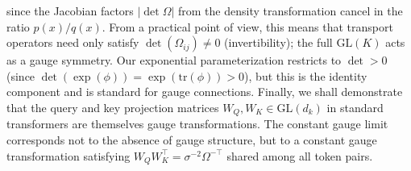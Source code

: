 \documentclass[twoside,11pt]{article}
\begin{document}
since the Jacobian factors $|\det\Omega|$ from the density transformation cancel in the ratio $p(x)/q(x)$. From a practical point of view, this means that transport operators need only satisfy $\det(\Omega_{ij}) \neq 0$ (invertibility); the full $\mathrm{GL}(K)$ acts as a gauge symmetry. Our exponential parameterization restricts to $\det > 0$ (since $\det(\exp(\phi)) = \exp(\mathrm{tr}(\phi)) > 0$), but this is the identity component and is standard for gauge connections. Finally, we shall demonstrate that the query and key projection matrices $W_Q, W_K \in \mathrm{GL}(d_k)$ in standard transformers are themselves gauge transformations. The constant gauge limit corresponds not to the absence of gauge structure, but to a constant gauge transformation satisfying $W_Q W_K^\top = \sigma^{-2}\Omega^{-\top}$ shared among all token pairs.
\end{document}
